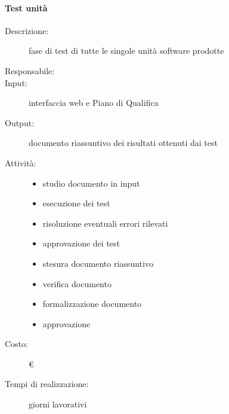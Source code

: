 \paragraph{Test unità}
\begin{description}
\item[Descrizione:] fase di test di tutte le singole unità software prodotte 

\item[Responsabile:] 

\item[Input:] interfaccia web e Piano di Qualifica

\item[Output:] documento riassuntivo dei risultati ottenuti dai test

\item[Attività:]
\begin{itemize}
\item studio documento in input
\item esecuzione dei test
\item risoluzione eventuali errori rilevati
\item approvazione dei test
\item stesura documento riassuntivo
\item verifica documento
\item formalizzazione documento
\item approvazione
\end{itemize}
\item[Costo:] \euro 
\item[Tempi di realizzazione:]  giorni lavorativi
\end{description}



